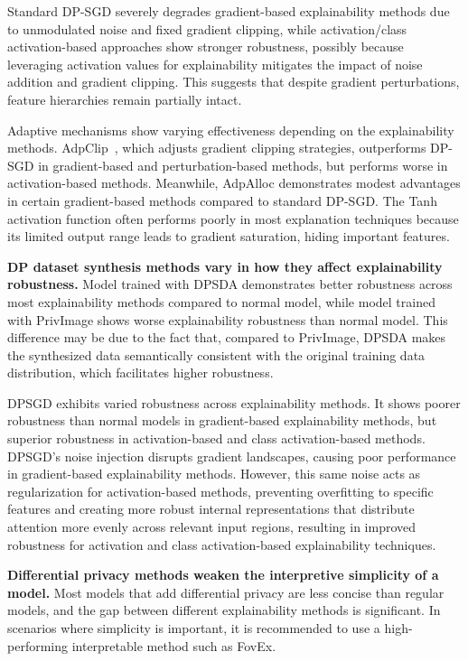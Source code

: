 \documentclass{article}
\begin{document}
Standard DP-SGD severely degrades gradient-based explainability methods due to unmodulated noise and fixed gradient clipping, while activation/class activation-based approaches show stronger robustness, possibly because leveraging activation values for explainability mitigates the impact of noise addition and gradient clipping. This suggests that despite gradient perturbations, feature hierarchies remain partially intact.

Adaptive mechanisms show varying effectiveness depending on the explainability methods. AdpClip~\cite{andrew2021differentially}, which adjusts gradient clipping strategies, outperforms DP-SGD in gradient-based and perturbation-based methods, but performs worse in activation-based methods. Meanwhile, AdpAlloc demonstrates modest advantages in certain gradient-based methods compared to standard DP-SGD. The Tanh activation function often performs poorly in most explanation techniques because its limited output range leads to gradient saturation, hiding important features.

\noindent \textbf{DP dataset synthesis methods vary in how they affect explainability robustness. }Model trained with DPSDA demonstrates better robustness across most explainability methods compared to normal model, while model trained with PrivImage shows worse explainability robustness than normal model. This difference may be due to the fact that, compared to PrivImage, DPSDA makes the synthesized data semantically consistent with the original training data distribution, which facilitates higher robustness.

DPSGD exhibits varied robustness across explainability methods.
It shows poorer robustness than normal models in gradient-based explainability methods, but superior robustness in activation-based and class activation-based methods. DPSGD's noise injection disrupts gradient landscapes, causing poor performance in gradient-based explainability methods. However, this same noise acts as regularization for activation-based methods, preventing overfitting to specific features and creating more robust internal representations that distribute attention more evenly across relevant input regions, resulting in improved robustness for activation and class activation-based explainability techniques.

\noindent \textbf{Differential privacy methods weaken the interpretive simplicity of a model.} Most models that add differential privacy are less concise than regular models, and the gap between different explainability methods is significant. In scenarios where simplicity is important, it is recommended to use a high-performing interpretable method such as FovEx.
\end{document}
